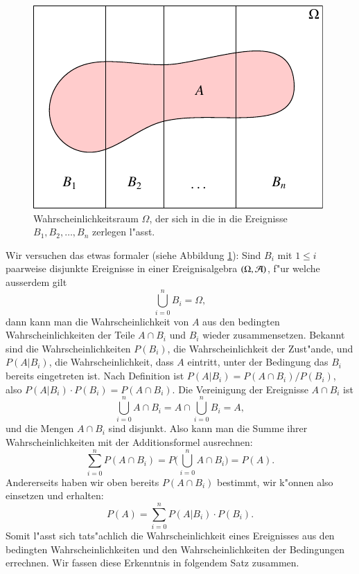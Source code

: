 \begin{figure}
\begin{center}
\includegraphics[width=0.8\hsize]{images/total-1.pdf}
\end{center}
\caption{Wahrscheinlichkeitsraum $\Omega$, der sich in die in die
Ereignisse $B_1,B_2,\dots,B_n$ zerlegen l"asst.\label{zerlegung}}
\end{figure}
Wir versuchen das etwas formaler (siehe Abbildung \ref{zerlegung}): Sind $B_i$ mit $1\le i$ paarweise
disjunkte Ereignisse
in einer Ereignisalgebra $(\Omega,{\cal A})$, f"ur welche ausserdem
gilt
\[
\bigcup_{i=0}^{n}B_i = \Omega,
\]
dann kann man die Wahrscheinlichkeit von $A$ aus den bedingten
Wahrscheinlichkeiten der Teile $A\cap B_i$ und $B_i$ wieder zusammensetzen.
Bekannt sind die Wahrscheinlichkeiten
$P(B_i)$, die Wahrscheinlichkeit der Zust"ande, und
$P(A|B_i)$, die Wahrscheinlichkeit, dass $A$ eintritt, unter der Bedingung
das $B_i$ bereits eingetreten ist.
Nach Definition ist $P(A|B_i)=P(A\cap B_i)/P(B_i)$, also
$P(A|B_i)\cdot P(B_i) = P(A\cap B_i)$. Die Vereinigung der Ereignisse
$A\cap B_i$ ist
\[
\bigcup_{i=0}^{n} A\cap B_i=A\cap\bigcup_{i=0}^{n}B_i=A,
\]
und die Mengen $A\cap B_i$ sind disjunkt. Also kann man die Summe ihrer
Wahrscheinlichkeiten mit der Additionsformel ausrechnen:
\[
\sum_{i=0}^{n}P(A\cap B_i)=P\biggl(\bigcup_{i=0}^{n}A\cap B_i\biggr)=P(A).
\]
Andererseits
haben wir oben bereits $P(A\cap B_i)$ bestimmt, wir k"onnen
also einsetzen und erhalten:
\[
P(A)=\sum_{i=0}^{n}P(A|B_i)\cdot P(B_i).
\]
Somit l"asst sich tats"achlich die Wahrscheinlichkeit eines Ereignisses
aus den bedingten Wahrscheinlichkeiten und den Wahrscheinlichkeiten
der Bedingungen errechnen. Wir fassen diese Erkenntnis in folgendem 
Satz zusammen.
